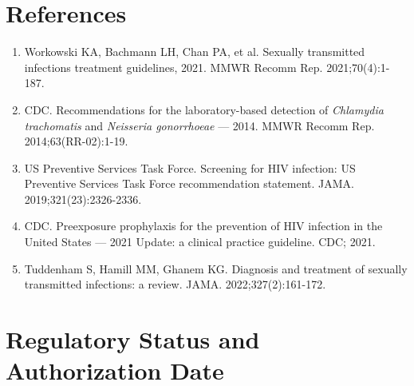 \section*{References}
\begin{enumerate}
  \item Workowski KA, Bachmann LH, Chan PA, et al. Sexually transmitted infections treatment guidelines, 2021. MMWR Recomm Rep. 2021;70(4):1-187.
  \item CDC. Recommendations for the laboratory-based detection of \textit{Chlamydia trachomatis} and \textit{Neisseria gonorrhoeae} --- 2014. MMWR Recomm Rep. 2014;63(RR-02):1-19.
  \item US Preventive Services Task Force. Screening for HIV infection: US Preventive Services Task Force recommendation statement. JAMA. 2019;321(23):2326-2336.
  \item CDC. Preexposure prophylaxis for the prevention of HIV infection in the United States --- 2021 Update: a clinical practice guideline. CDC; 2021.
  \item Tuddenham S, Hamill MM, Ghanem KG. Diagnosis and treatment of sexually transmitted infections: a review. JAMA. 2022;327(2):161-172.
\end{enumerate}

\clearpage
\section*{Regulatory Status and Authorization Date}

\clearpage
